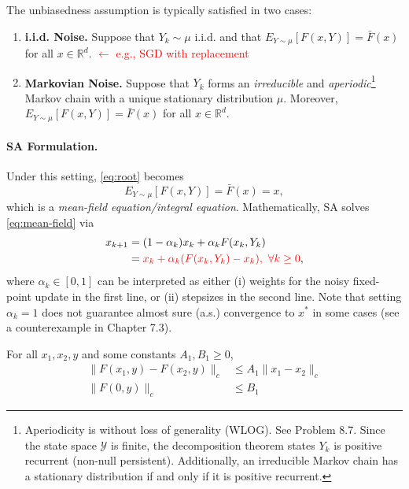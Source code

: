 \documentclass[11pt,twoside]{article}
\begin{document}
\begin{assumption}[Unbiasedness of $F$]
\label{ass:unbiased}
 The unbiasedness assumption is typically satisfied in two cases:
    \begin{enumerate}
    \item \textbf{i.i.d. Noise.} Suppose that $Y_k \sim \mu$ i.i.d. and that $E_{Y \sim \mu}[F(x,Y)] = \bar F(x)$ for all $x \in \mathbb{R}^d$. \textcolor{red}{$\leftarrow$ e.g., SGD with replacement}
    \item \textbf{Markovian Noise.} Suppose that $Y_k$ forms an \emph{irreducible} and \emph{aperiodic}\footnote{Aperiodicity is without loss of generality (WLOG). See Problem 8.7. Since the state space $\mathcal{Y}$ is finite, the decomposition theorem states $Y_k$ is positive recurrent (non-null persistent). Additionally, an irreducible Markov chain has a stationary distribution if and only if it is positive recurrent.} Markov chain with a unique stationary distribution $\mu$. Moreover, $E_{Y \sim \mu}[F(x,Y)] = \bar F(x)$ for all $x \in \mathbb{R}^d$.
\end{enumerate}
\end{assumption}

\paragraph{SA Formulation.} Under this setting, \eqref{eq:root} becomes
\begin{equation}
\label{eq:mean-field}
    E_{Y \sim \mu}[F(x,Y)] = \bar F(x) = x,
\end{equation}
which is a \emph{mean-field equation/integral equation}. Mathematically, SA solves \eqref{eq:mean-field} via 
\begin{align}
\label{eq:SA}
    x_{k+1} &= (1-\alpha_k)x_k + \alpha_kF(x_k,Y_k) \\
\label{eq:SA2}    
    &= \textcolor{red}{x_k + \alpha_k(F(x_k,Y_k)-x_k),~\forall k \geq 0},
\end{align}
where $\alpha_{k} \in [0,1]$ can be interpreted as either (i) weights for the noisy fixed-point update in the first line, or (ii) stepsizes in the second line. Note that setting $\alpha_k = 1$ does not guarantee almost sure (a.s.) convergence to $x^*$ in some cases (see a counterexample in Chapter 7.3). 

\begin{assumption}
\label{assumption:lip}
For all $x_1,x_2,y$ and some constants $A_1, B_1 \geq 0$,
\begin{align}
\label{eq:lip}
    \|F(x_1, y) - F(x_2, y)\|_c &\leq A_1 \|x_1-x_2\|_c \\
\label{eq;unifbdd}
    \|F(0, y)\|_c &\leq B_1 
\end{align}
    
\end{assumption}
\end{document}
